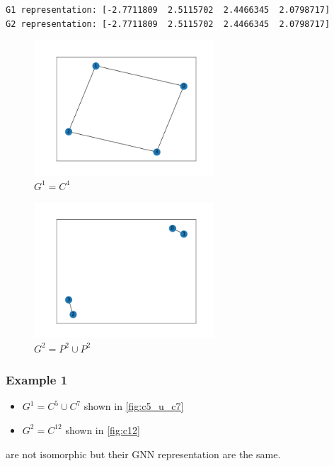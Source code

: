 \documentclass[a4paper]{article}
\begin{document}
\begin{verbatim}
G1 representation: [-2.7711809  2.5115702  2.4466345  2.0798717]
G2 representation: [-2.7711809  2.5115702  2.4466345  2.0798717]
\end{verbatim}

\begin{figure}[ht]
    \centering
    \includegraphics[width=0.6\textwidth]{figures/c4.png}
    \caption{$G^1 =C^4$}
    \label{fig:c4}
\end{figure}

\begin{figure}[ht]
    \centering
    \includegraphics[width=0.6\textwidth]{figures/2k2.png}
    \caption{$G^2 =P^2 \cup P^2$}
    \label{fig:2k2}
\end{figure}

\break

\subsubsection*{Example 1}
\begin{itemize}
    \item $G^1 =C^5 \cup C^7$ shown in \ref{fig:c5_u_c7}
    \item $G^2 =C^{12}$ shown in \ref{fig:c12}
\end{itemize} 
are not isomorphic but their GNN representation are the same.
\end{document}
